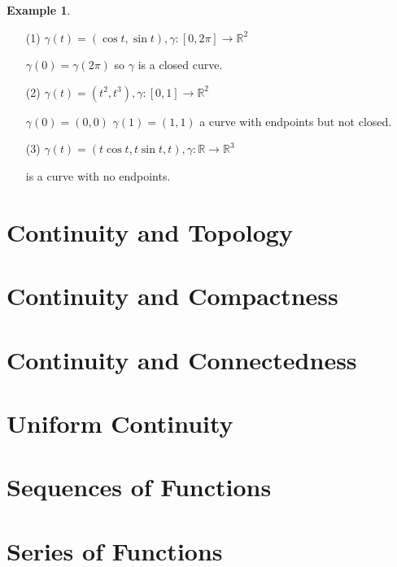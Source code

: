 \documentclass[12pt]{amsbook}
\theoremstyle{definition}
\newtheorem{example}[theorem]{Example}
\newcommand{\RR}{{\mathbb R}}
\newcommand{\ra}{\rightarrow} %
\begin{document}
\begin{example}
\begin{itemize}
\item[(1)] $\gamma(t) = \left(\cos t, \sin t\right), \gamma: [0, 2\pi] \ra \RR^2$

$\gamma(0) = \gamma(2\pi)$ so $\gamma$ is a closed curve.


\item[(2)] $\gamma(t) = \left(t^2, t^3 \right), \gamma: [0, 1] \ra \RR^2$

$\gamma(0) = (0,0)$  $\gamma(1) = (1,1)$ a curve with endpoints but not closed.


\item[(3)] $\gamma(t) = \left(t \cos t, t \sin t, t \right), \gamma: \RR \ra \RR^3$

is a curve with no endpoints.
\end{itemize}
\end{example}

\section{Continuity and Topology}

\section{Continuity and Compactness}

\section{Continuity and Connectedness}

\section{Uniform Continuity}

\section{Sequences of Functions}

\section{Series of Functions}
\end{document}
